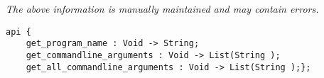 \label{api:Commandline}

{\tiny \it The above information is manually maintained and may contain errors.}
\begin{verbatim}
api {
    get_program_name : Void -> String;
    get_commandline_arguments : Void -> List(String );
    get_all_commandline_arguments : Void -> List(String );};
\end{verbatim}

